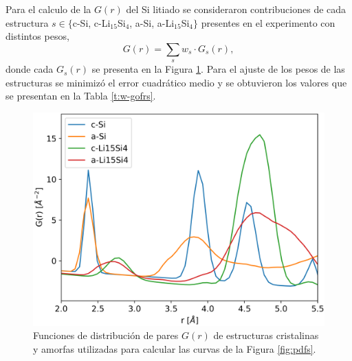Para el calculo de la $G(r)$ del Si litiado se consideraron contribuciones 
de cada estructura $s \in \lbrace$c-Si, c-Li$_{15}$Si$_4$, a-Si, 
a-Li$_{15}$Si$_4\rbrace$ presentes en el experimento con distintos pesos,
\begin{equation}\label{eq:contributions}
    G(r) = \sum_s w_s \cdot G_s(r),
\end{equation}
donde cada $G_s(r)$ se presenta en la Figura \ref{fig:gofrs}. Para el 
ajuste de los pesos de las estructuras se minimizó el error cuadrático 
medio y se obtuvieron los valores que se presentan en la Tabla 
\ref{t:w-gofrs}.

\begin{figure}[h!]
    \centering
    \includegraphics[width=.7\textwidth]{Silicio/prediccion/resultados/xray/gofrs.png}
    \caption{Funciones de distribución de pares $G(r)$ de estructuras 
    cristalinas y amorfas utilizadas para calcular las curvas de la Figura 
    \ref{fig:pdfs}.}
    \label{fig:gofrs}
\end{figure}

\begin{table}[h!]
    \centering
    \caption{Factor de peso de cada contribución (c-Si, c-Li$_{15}$Si$_4$, a-Si y 
    a-Li$_{15}$Si$_4$) a la función distribución radial de a pares $G(r)$ del 
    Si litiado (ver las Figuras \ref{fig:gofrs} y \ref{fig:pdfs} y la ecuación 
    \ref{eq:contributions}). El porcentaje de cada peso se agrega entre paréntesis.}
    \setlength\extrarowheight{2pt}
    \label{t:w-gofrs}
\end{table}

